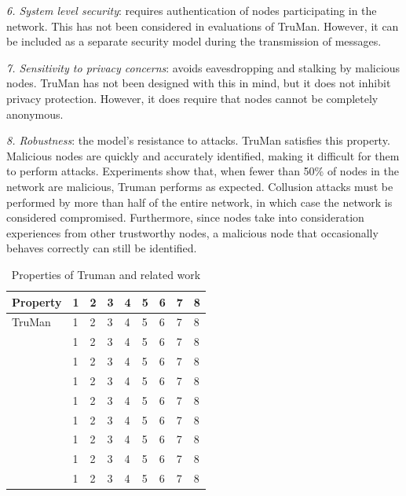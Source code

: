 \textit{6. System level security}: requires authentication of nodes participating in the network.
This has not been considered in evaluations of TruMan.
However, it can be included as a separate security model during the transmission of messages.

\textit{7. Sensitivity to privacy concerns}: avoids eavesdropping and stalking by malicious nodes.
TruMan has not been designed with this in mind, but it does not inhibit privacy protection.
However, it does require that nodes cannot be completely anonymous.

\textit{8. Robustness}: the model's resistance to attacks.
TruMan satisfies this property. Malicious nodes are quickly and accurately identified, making it difficult for them to perform attacks.
Experiments show that, when fewer than 50\% of nodes in the network are malicious, Truman performs as expected.
Collusion attacks must be performed by more than half of the entire network, in which case the network is considered compromised.
Furthermore, since nodes take into consideration experiences from other trustworthy nodes, a malicious node that occasionally behaves correctly can still be identified. 

\begin{table}[t!]
\caption{Properties of Truman and related work}
\label{table:properties}
\centering
\begin{tabular}{|p{4cm}||p{0.5cm}|p{0.5cm}|p{0.5cm}|p{0.5cm}|p{0.5cm}|p{0.5cm}|p{0.5cm}|p{0.5cm}|}
 \hline
 \textbf{Property} & 1 & 2 & 3 & 4 & 5 & 6 & 7 & 8\\
 \hline
 TruMan & 1 & 2 & 3 & 4 & 5 & 6 & 7 & 8\\
 \hline
 \cite{vernize2015malicious} & 1 & 2 & 3 & 4 & 5 & 6 & 7 & 8\\
 \hline
 \cite{dotzer2005vars} & 1 & 2 & 3 & 4 & 5 & 6 & 7 & 8\\
 \hline
 \cite{minhas2010towards} & 1 & 2 & 3 & 4 & 5 & 6 & 7 & 8\\
 \hline
 \cite{chen2010trust} & 1 & 2 & 3 & 4 & 5 & 6 & 7 & 8\\
 \hline
 \cite{park2011long} & 1 & 2 & 3 & 4 & 5 & 6 & 7 & 8\\
 \hline
 \cite{huang2014social} & 1 & 2 & 3 & 4 & 5 & 6 & 7 & 8\\
 \hline
 \cite{li2016art} & 1 & 2 & 3 & 4 & 5 & 6 & 7 & 8\\
 \hline
 \cite{chen2017cloud} & 1 & 2 & 3 & 4 & 5 & 6 & 7 & 8\\
 \hline
\end{tabular}
\end{table}

